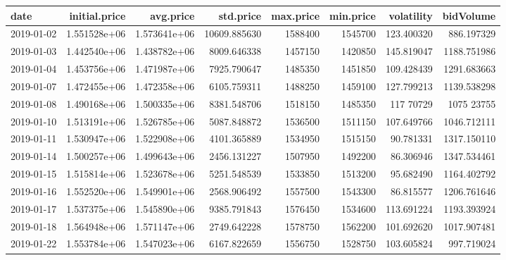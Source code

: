 \documentclass[10pt,a4paper]{article}
\begin{document}
	
\begin{table}
\centering
\begin{tiny}
	{
		\begin{tabular}{lrrrrrrr}
			\textbf{date} &   \textbf{ initial.price} &    \textbf{avg.price} &     \textbf{std.price} &  \textbf{max.price} &  \textbf{min.price} &   \textbf{volatility} &    \textbf{bidVolume} \\ 
			\hline		
			2019-01-02 &   1.551528e+06 &  1.573641e+06 &  10609.885630 &  1588400   &  1545700   &      123.400320 &   886.197329 \\
			2019-01-03 &   1.442540e+06 &  1.438782e+06 &   8009.646338 &  1457150   &  1420850   &       145.819047 &  1188.751986 \\
			2019-01-04 &   1.453756e+06 &  1.471987e+06 &   7925.790647 &  1485350   &  1451850   &       109.428439 &  1291.683663 \\
			2019-01-07 &   1.472455e+06 &  1.472358e+06 &   6105.759311 &  1488250   &  1459100   &       127.799213 &  1139.538298 \\
			2019-01-08 &   1.490168e+06 &  1.500335e+06 &   8381.548706 &  1518150   &  1485350   &      117  70729 &  1075  23755 \\
			2019-01-10 &   1.513191e+06 &  1.526785e+06 &   5087.848872 &  1536500   &  1511150   &       107.649766 &  1046.712111 \\
			2019-01-11 &   1.530947e+06 &  1.522908e+06 &   4101.365889 &  1534950   &  1515150   &      90.781331 &  1317.150110 \\ 
			2019-01-14 &   1.500257e+06 &  1.499643e+06 &   2456.131227 &  1507950   &  1492200   &     86.306946 &  1347.534461 \\
			2019-01-15 &   1.515814e+06 &  1.523678e+06 &   5251.548539 &  1533850   &  1513200   &     95.682490 &  1164.402792 \\
			2019-01-16 &   1.552520e+06 &  1.549901e+06 &   2568.906492 &  1557500   &  1543300   &      86.815577 &  1206.761646 \\
			2019-01-17 &   1.537375e+06 &  1.545890e+06 &   9385.791843 &  1576450   &  1534600   &   113.691224 &  1193.393924 \\
			2019-01-18 &   1.564948e+06 &  1.571147e+06 &   2749.642228 &  1578750   &  1562200   &       101.692620 &  1017.907481 \\
			2019-01-22 &   1.553784e+06 &  1.547023e+06 &   6167.822659 &  1556750   &  1528750   &      103.605824 &   997.719024 \\

\end{tabular}}
\end{tiny}
\end{table}
\end{document}
